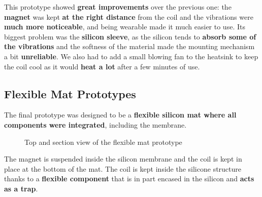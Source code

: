 This prototype showed \textbf{great improvements} over the previous one: the \textbf{magnet} was kept \textbf{at the right distance} from the coil and the vibrations were \textbf{much more noticeable}, and being wearable made it much easier to use.
Its biggest problem was the \textbf{silicon sleeve}, as the silicon tends to \textbf{absorb some of the vibrations} and the softness of the material made the mounting mechanism a bit \textbf{unreliable}.  
We also had to add a small blowing fan to the heatsink to keep the coil cool as it would \textbf{heat a lot} after a few minutes of use.

\subsection{Flexible Mat Prototypes}
The final prototype was designed to be a \textbf{flexible silicon mat where all components were integrated}, including the membrane.

\newsavebox{\largestimage}
\begin{figure}[H]
    \centering
    \begin{subcaptiongroup}
        \centering
        \parbox[b]{0.2\textwidth}{
            \centering
            \usebox{
                \largestimage
            }
        }
        \parbox[b]{0.2\textwidth}{
            \centering
        }
    \end{subcaptiongroup}
    \caption{Top and section view of the flexible mat prototype}
\end{figure}
The magnet is suspended inside the silicon membrane and the coil is kept in place at the bottom of the mat.
The coil is kept inside the silicone structure thanks to a \textbf{flexible component} that is in part encased in the silicon and \textbf{acts as a trap}.

